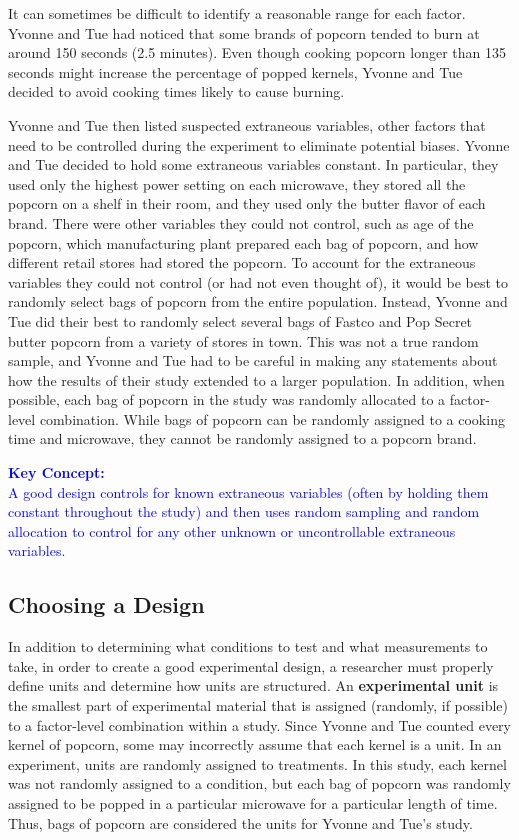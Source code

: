 \documentclass[
]{book}
\begin{document}
It can sometimes be difficult to identify a reasonable range for each factor. Yvonne and Tue had noticed that some brands of popcorn tended to burn at around 150 seconds (2.5 minutes). Even though cooking popcorn longer than 135 seconds might increase the percentage of popped kernels, Yvonne and Tue decided to avoid cooking times likely to cause burning.

Yvonne and Tue then listed suspected extraneous variables, other factors that need to be controlled during the experiment to eliminate potential biases. Yvonne and Tue decided to hold some extraneous variables constant. In particular, they used only the highest power setting on each microwave, they stored all the popcorn on a shelf in their room, and they used only the butter flavor of each brand. There were other variables they could not control, such as age of the popcorn, which manufacturing plant prepared each bag of popcorn, and how different retail stores had stored the popcorn. To account for the extraneous variables they could not control (or had not even thought of), it would be best to randomly select bags of popcorn from the entire population. Instead, Yvonne and Tue did their best to randomly select several bags of Fastco and Pop Secret butter popcorn from a variety of stores in town. This was not a true random sample, and Yvonne and Tue had to be careful in making any statements about how the results of their study extended to a larger population. In addition, when possible, each bag of popcorn in the study was randomly allocated to a factor-level combination. While bags of popcorn can be randomly assigned to a cooking time and microwave, they cannot be randomly assigned to a popcorn brand.

\textbf{\textcolor{blue}{Key Concept:}}\\
\textcolor{blue}{A good design controls for known extraneous variables (often by holding them constant throughout the study) and then uses random sampling and random allocation to control for any other unknown or uncontrollable extraneous variables.}

\hypertarget{choosing-a-design}{%
\subsection*{Choosing a Design}\label{choosing-a-design}}

In addition to determining what conditions to test and what measurements to take, in order to create a good experimental design, a researcher must properly define units and determine how units are structured. An \textbf{experimental unit} is the smallest part of experimental material that is assigned (randomly, if possible) to a factor-level combination within a study. Since Yvonne and Tue counted every kernel of popcorn, some may incorrectly assume that each kernel is a unit. In an experiment, units are randomly assigned to treatments. In this study, each kernel was not randomly assigned to a condition, but each bag of popcorn was randomly assigned to be popped in a particular microwave for a particular length of time. Thus, bags of popcorn are considered the units for Yvonne and Tue's study.
\end{document}
